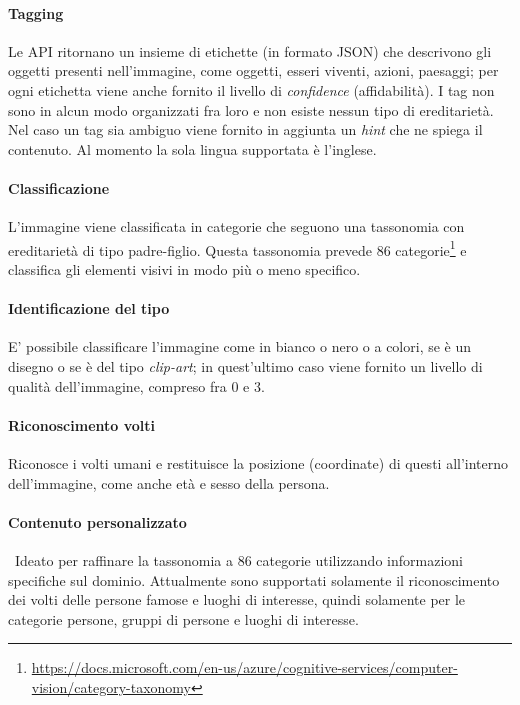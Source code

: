 \paragraph{Tagging} Le API ritornano un insieme di etichette (in formato JSON) che descrivono gli oggetti presenti nell'immagine, come oggetti, esseri viventi, azioni, paesaggi; per ogni etichetta viene anche fornito il livello di \textit{confidence} (affidabilità). I tag non sono in alcun modo organizzati fra loro e non esiste nessun tipo di ereditarietà.
Nel caso un tag sia ambiguo viene fornito in aggiunta un \textit{hint} che ne spiega il contenuto.
Al momento la sola lingua supportata è l'inglese.

\paragraph{Classificazione} L'immagine viene classificata in categorie che seguono una tassonomia con ereditarietà di tipo padre-figlio. Questa tassonomia prevede 86 categorie\footnote{\url{https://docs.microsoft.com/en-us/azure/cognitive-services/computer-vision/category-taxonomy}} e classifica gli elementi visivi in modo più o meno specifico.

\paragraph{Identificazione del tipo} E' possibile classificare l'immagine come in bianco o nero o a colori, se è un disegno o se è del tipo \textit{clip-art}; in quest'ultimo caso viene fornito un livello di qualità dell'immagine, compreso fra 0 e 3.

\paragraph{Riconoscimento volti} Riconosce i volti umani e restituisce la posizione (coordinate) di questi all'interno dell'immagine, come anche età e sesso della persona.

\paragraph{Contenuto personalizzato} Ideato per raffinare la tassonomia a 86 categorie utilizzando informazioni specifiche sul dominio.
Attualmente sono supportati solamente il riconoscimento dei volti delle persone famose e luoghi di interesse,
quindi solamente per le categorie persone, gruppi di persone e luoghi di interesse.

